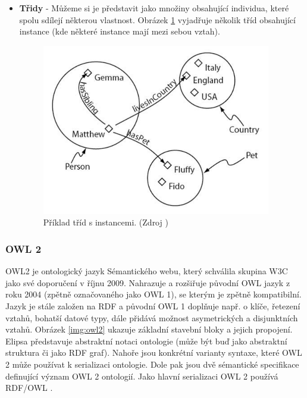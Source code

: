 \begin{itemize}
            
            \item \textbf{Třidy} - Můžeme si je představit jako množiny obsahující individua, které spolu sdílejí některou vlastnost.
            Obrázek \ref{img:classesindividuals} vyjadřuje několik tříd obsahující instance (kde některé instance mají mezi sebou vztah). 
            
            \begin{figure}[h]
            \begin{center}
            \includegraphics[width=10cm]{figures/classes}
            \caption{Příklad tříd s instancemi. (Zdroj \cite{owltutorial})}
            \label{img:classesindividuals}
            \end{center}
            \end{figure}
            
            \end{itemize}
            
        \subsubsection{OWL 2}  
            
        OWL2 je ontologický jazyk Sémantického webu, který schválila skupina W3C jako své doporučení v říjnu 2009. Nahrazuje a rozšiřuje původní OWL jazyk z roku 2004 (zpětně označovaného jako OWL 1), se kterým je zpětně kompatibilní. Jazyk je stále založen na RDF a původní OWL 1 doplňuje např. o klíče, řetezení vztahů, bohatší datové typy, dále přidává možnost asymetrických a disjunktních vztahů.
        Obrázek \ref{img:owl2} ukazuje základní stavební bloky a jejich propojení. Elipsa představuje abstraktní notaci ontologie (může být buď jako abstraktní struktura či jako RDF graf). Nahoře jsou konkrétní varianty syntaxe, které OWL 2 může používat k serializaci ontologie. Dole pak jsou dvě sémantické specifikace definující význam OWL 2 ontologií.
        Jako hlavní serializaci OWL 2 používá RDF/OWL \cite{owl2}.
       
